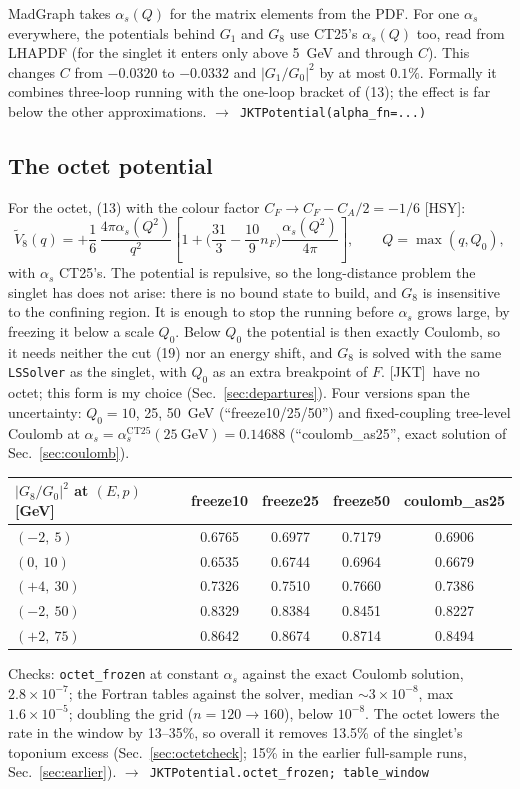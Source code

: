 \documentclass[11pt]{article}
\newcommand{\code}[1]{\texttt{#1}}
\newcommand{\JKT}{[JKT]}
\newcommand{\HSY}{[HSY]}
\newcommand{\fn}[1]{\hfill$\to$~\code{#1}}
\begin{document}
MadGraph takes $\alpha_s(Q)$ for the matrix elements from the PDF. For one $\alpha_s$ everywhere, the potentials behind $G_1$ and
$G_8$ use CT25's $\alpha_s(Q)$ too, read from LHAPDF (for the singlet it enters only above 5~GeV and through $C$). This changes $C$
from $-0.0320$ to $-0.0332$ and $|G_1/G_0|^2$ by at most $0.1\%$. Formally it combines three-loop running with the one-loop bracket
of (13); the effect is far below the other approximations. \fn{JKTPotential(alpha\_fn=...)}

\subsection{The octet potential}
\label{sec:octetpot}
For the octet, (13) with the colour factor $C_F\to C_F-C_A/2=-1/6$ \HSY:
$$
\tilde V_8(q)=+\frac16\,\frac{4\pi\alpha_s(Q^2)}{q^2}\left[1+\Big(\frac{31}{3}-\frac{10}{9}n_F\Big)\frac{\alpha_s(Q^2)}{4\pi}\right],
\qquad Q=\max(q,Q_0),
$$
with $\alpha_s$ CT25's. The potential is repulsive, so the long-distance problem the singlet has does not arise: there is no
bound state to build, and $G_8$ is insensitive to the confining region. It is enough to stop the running before $\alpha_s$ grows
large, by freezing it below a scale $Q_0$. Below $Q_0$ the potential is then exactly Coulomb, so it needs neither the cut (19) nor
an energy shift, and $G_8$ is solved with the same \code{LSSolver} as the singlet, with $Q_0$ as an extra breakpoint of $F$.
\JKT\ have no octet; this form is my choice (Sec.~\ref{sec:departures}). Four versions span the uncertainty: $Q_0=10$, 25, 50~GeV
(``freeze10/25/50'') and fixed-coupling tree-level Coulomb at $\alpha_s=\alpha_s^\mathrm{CT25}(25~\mathrm{GeV})=0.14688$
(``coulomb\_as25'', exact solution of Sec.~\ref{sec:coulomb}).

\begin{center}\small
\begin{tabular}{@{}lcccc@{}}
\toprule
$|G_8/G_0|^2$ at $(E,p)$ [GeV] & freeze10 & freeze25 & freeze50 & coulomb\_as25\\
\midrule
$(-2,\ 5)$  & 0.6765 & 0.6977 & 0.7179 & 0.6906\\
$(0,\ 10)$  & 0.6535 & 0.6744 & 0.6964 & 0.6679\\
$(+4,\ 30)$ & 0.7326 & 0.7510 & 0.7660 & 0.7386\\
$(-2,\ 50)$ & 0.8329 & 0.8384 & 0.8451 & 0.8227\\
$(+2,\ 75)$ & 0.8642 & 0.8674 & 0.8714 & 0.8494\\
\bottomrule
\end{tabular}
\end{center}
Checks: \code{octet\_frozen} at constant $\alpha_s$ against the exact Coulomb solution, $2.8\times10^{-7}$; the Fortran tables
against the solver, median $\sim3\times10^{-8}$, max $1.6\times10^{-5}$; doubling the grid ($n=120\to160$), below $10^{-8}$.
The octet lowers the rate in the window by 13--35\%, so overall it removes 13.5\% of the singlet's toponium excess
(Sec.~\ref{sec:octetcheck}; 15\% in the earlier full-sample runs, Sec.~\ref{sec:earlier}). \fn{JKTPotential.octet\_frozen; table\_window}
\end{document}

